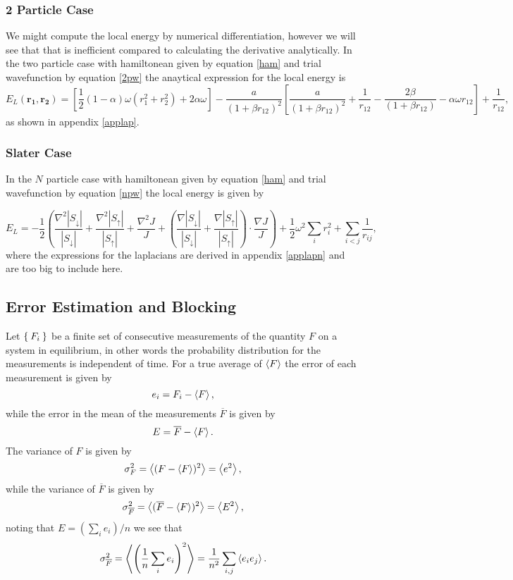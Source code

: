 \documentclass[a4paper,English,10pt]{article}
\newcommand{\bb}[1]{\boldsymbol{#1}}
\newcommand{\uar}{\uparrow}
\newcommand{\dar}{\downarrow}
\newcommand{\be}{\begin{equation}}
\newcommand{\ee}{\end{equation}}
\newcommand{\f}{\frac}
\renewcommand{\bar}{\overline}
\renewcommand{\braket}{\Braket}
\begin{document}
\subsubsection{2 Particle Case}
We might compute the local energy by numerical differentiation, however we will see that that is inefficient compared to calculating the derivative analytically.
In the two particle case with hamiltonean given by equation \ref{ham} and trial wavefunction by equation \ref{2pw} the anaytical expression for the local energy is
\be
E_L(\bb{r_1},\bb{r_2}) = \left[\f{1}{2}(1- \alpha)\omega(r_1^2 + r_2^2) + 2\alpha\omega\right]  - \f{a}{(1+\beta r_{12})^2}\left[\f{a}{(1+\beta r_{12})^2}+  \f{1}{r_{12}} - \f{2\beta}{(1+\beta r_{12})} -\alpha\omega r_{12}\right] + \f{1}{r_{12}},
\ee
as shown in appendix \ref{applap}.

\subsubsection{Slater Case}
In the $N$ particle case with hamiltonean given by equation \ref{ham} and trial wavefunction by equation \ref{npw} the local energy is given by

\be
E_L = -\f{1}{2}\left(\f{\nabla^2|S_\dar|}{|S_\dar|} + \f{\nabla^2|S_\uar|}{|S_\uar|} + \f{\nabla^2J}{J} +  \left(\f{\nabla|S_\dar|}{|S_\dar|} + \f{\nabla|S_\uar|}{|S_\uar|}\right)\cdot
\f{\nabla J}{J}\right) + \f{1}{2}\omega^2\sum_ir_i^2 + \sum_{i<j}\f{1}{r_{ij}},
\ee
where the expressions for the laplacians are derived in appendix \ref{applapn} and are too big to include here.

\subsection{Error Estimation and Blocking}

Let $\Set{F_i}$ be a finite set of consecutive measurements of the quantity $F$ on a system in equilibrium, in other words the probability distribution for the measurements is
independent of time. For a true average of $\braket{F}$ the error of each measurement is given by
\be
e_i = F_i - \braket{F},
\ee
while the error in the mean of the measurements $\bar{F}$ is given by
\be
E = \bar{F} - \braket{F}.
\ee
The variance of $F$ is given by
\be
\sigma^2_F = \braket{(F-\braket{F})^2} = \braket{e^2},
\ee
while the variance of $\bar{F}$ is given by
\be
\sigma^2_{\bar{F}} = \braket{(\bar{F}-\braket{F})^2} = \braket{E^2},
\ee
noting that $E = (\sum_ie_i)/n$ we see that
\be
\sigma^2_{\bar{F}} = \braket{\left(\f{1}{n}\sum_ie_i\right)^2} = \f{1}{n^2}\sum_{i,j}\braket{e_ie_j}.\label{sigmam}
\ee
\end{document}
